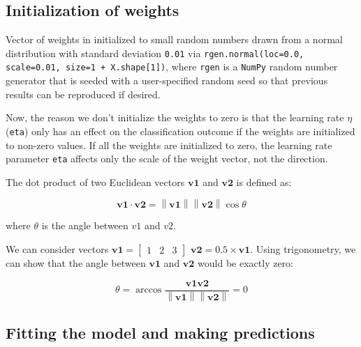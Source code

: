 \documentclass[11pt]{article}
\newcommand{\norm}[1]{\left\lVert#1\right\rVert}
\newcommand{\vect}[1]{\boldsymbol{#1}}
\begin{document}
    \subsection{Initialization of weights} \label{subsec:perc_weights}

    Vector of weights in initialized to small random numbers drawn from a normal distribution with standard deviation \texttt{0.01} via \texttt{rgen.normal(loc=0.0, scale=0.01, size=1 + X.shape[1])}, where \texttt{rgen} is a \texttt{NumPy} random number generator that is seeded with a user-specified random seed so that previous results can be reproduced if desired.

    Now, the reason we don't initialize the weights to zero is that the learning rate $\eta$ (\texttt{eta}) only has an effect on the classification outcome if the weights are initialized to non-zero values.
    If all the weights are initialized to zero, the learning rate parameter \texttt{eta} affects only the scale of the weight vector, not the direction.

    The dot product of two Euclidean vectors $\vect{v1}$ and $\vect{v2}$ is defined as:

    \begin{equation}
        \label{eq:vec_dot}
        \vect{v1} \cdot \vect{v2} = \norm{\vect{v1}} \norm{\vect{v2}} \cos \theta
    \end{equation}

    where $\theta$ is the angle between $v1$ and $v2$.

    We can consider vectors $\vect{v1} = \begin{bmatrix}
                                             1 & 2 & 3
    \end{bmatrix}$ $\vect{v2}=0.5 \times{\vect{v1}}$.
    Using trigonometry, we can show that the angle between $\vect{v1}$ and $\vect{v2}$ would be exactly zero:

    \begin{equation}
        \label{}
        \theta = \arccos{\frac{\vect{v1}\vect{v2}} {\norm{\vect{v1}} \norm{\vect{v2}}}} = 0
    \end{equation}

    \subsection{Fitting the model and making predictions} \label{subsec:perc_fit_predict}
\end{document}
